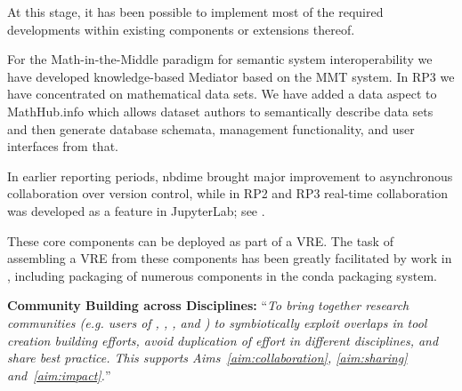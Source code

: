 \begin{compactenum}[\bf {Obj} 1\rm]
  At this stage, it has been possible to implement most of the required developments within
  existing components or extensions thereof.

  For the
  Math-in-the-Middle paradigm for semantic system interoperability we have developed
  knowledge-based Mediator based on the MMT system.
  In RP3 we have concentrated on mathematical data sets. We have added a data aspect to \textsf{MathHub.info} which allows dataset authors to semantically  describe data sets and then generate database schemata, management functionality, and user interfaces from that.

  In earlier reporting periods, nbdime brought major improvement to
  asynchronous collaboration over version control, while in RP2 and
  RP3 real-time collaboration was developed as a feature in
  JupyterLab; see .

  These core components can be deployed as part of a VRE.
  The task of assembling a VRE from these components
  has been greatly facilitated by work in ,
  including packaging of numerous \ODK components
  in the conda packaging system.

\item \label{objective:community}
  \textbf{Community Building across Disciplines:}
  ``\emph{To bring together research
    communities (e.g. users of \Jupyter, \Sage, \Singular, and \GAP) to
    symbiotically exploit overlaps in tool creation building efforts,
    avoid duplication of effort in different disciplines, and share best
    practice. This supports Aims~\ref{aim:collaboration},
    \ref{aim:sharing} and~\ref{aim:impact}.}''


\end{compactenum}
